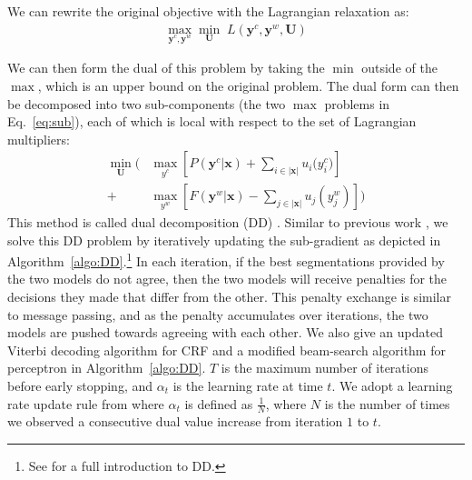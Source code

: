 We can rewrite the original objective with the Lagrangian relaxation as:
\begin{align}
   \max_{\mathbf{y^\textit{c}}, \mathbf{y^\textit{w}}} \min_{\mathbf{U}} \; L\left(\mathbf{y^\textit{c}}, \mathbf{y^\textit{w}}, \mathbf{U}\right)
\end{align}

We can then form the dual of this problem by taking the $\min$ outside of the $\max$, which is an upper bound on the original problem.  
The dual form can then be decomposed into two sub-components (the two $\max$ problems in Eq.~\ref{eq:sub}), each of which is local with respect to the set of Lagrangian multipliers:
\begin{align}\label{eq:sub}
\min_{\mathbf{U}}  \Biggl( & \max_{y^\textit{c}} \left[  P(\mathbf{y^\textit{c}} | \mathbf{x})  + \sum\limits_{i\in |\mathbf{x}|}{u_{i}(y_i^\textit{c}})  \right] \\ \nonumber
 +  &  \max_{y^\textit{w}}   \left[  F(\mathbf{y^\textit{w}} | \mathbf{x})  - \sum\limits_{j\in |\mathbf{x}|}{u_{j}(y_j^\textit{w})}  \right] \Biggr)
\end{align}
This method is called dual decomposition (DD) \cite{Rush:2010:EMNLP}.
Similar to previous work \cite{Rush:2012:JAIR}, we solve this DD problem by iteratively updating the sub-gradient as depicted in Algorithm~\ref{algo:DD}.\footnote{See  for a full introduction to DD.} 
In each iteration, if the best segmentations provided by the two models do not agree, then the two models will receive penalties for the decisions they made that differ from the other. This penalty exchange is similar to message passing, and as the penalty accumulates over iterations, the two models are pushed towards agreeing with each other. 
We also give an updated Viterbi decoding algorithm for CRF and a modified beam-search algorithm for perceptron in Algorithm~\ref{algo:DD}.
$T$ is the maximum number of iterations before early stopping, and $\alpha_t$ is the learning rate at time $t$. We adopt a learning rate update rule from  where $\alpha_t$ is defined as ${\frac{1}{N}}$, where $N$ is the number of times we observed a consecutive dual value increase from iteration $1$ to $t$.

